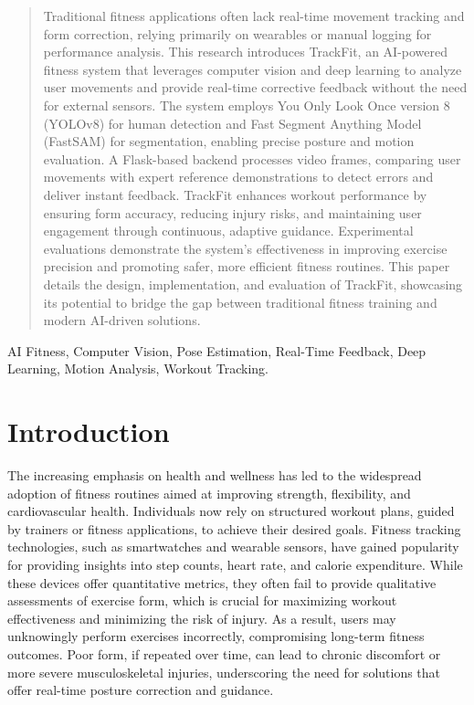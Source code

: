 \documentclass[conference]{IEEEtran}
\begin{document}
\begin{abstract}
Traditional fitness applications often lack real-time movement tracking and form correction, relying primarily on wearables or manual logging for performance analysis. This research introduces TrackFit, an AI-powered fitness system that leverages computer vision and deep learning to analyze user movements and provide real-time corrective feedback without the need for external sensors. The system employs You Only Look Once version 8 (YOLOv8) for human detection and Fast Segment Anything Model (FastSAM) for segmentation, enabling precise posture and motion evaluation. A Flask-based backend processes video frames, comparing user movements with expert reference demonstrations to detect errors and deliver instant feedback. TrackFit enhances workout performance by ensuring form accuracy, reducing injury risks, and maintaining user engagement through continuous, adaptive guidance. Experimental evaluations demonstrate the system's effectiveness in improving exercise precision and promoting safer, more efficient fitness routines. This paper details the design, implementation, and evaluation of TrackFit, showcasing its potential to bridge the gap between traditional fitness training and modern AI-driven solutions.
\end{abstract}

\begin{IEEEkeywords}
AI Fitness, Computer Vision, Pose Estimation, Real-Time Feedback, Deep Learning, Motion Analysis, Workout Tracking.
\end{IEEEkeywords}

\section{Introduction}
The increasing emphasis on health and wellness has led to the widespread adoption of fitness routines aimed at improving strength, flexibility, and cardiovascular health. Individuals now rely on structured workout plans, guided by trainers or fitness applications, to achieve their desired goals. Fitness tracking technologies, such as smartwatches and wearable sensors, have gained popularity for providing insights into step counts, heart rate, and calorie expenditure. While these devices offer quantitative metrics, they often fail to provide qualitative assessments of exercise form, which is crucial for maximizing workout effectiveness and minimizing the risk of injury. As a result, users may unknowingly perform exercises incorrectly, compromising long-term fitness outcomes. Poor form, if repeated over time, can lead to chronic discomfort or more severe musculoskeletal injuries, underscoring the need for solutions that offer real-time posture correction and guidance.
\end{document}
